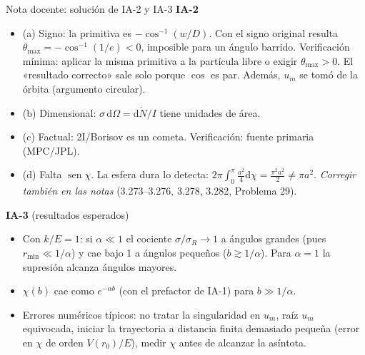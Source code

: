 \documentclass[aspectratio=169]{beamer}
\providecommand{\sen}{}
\renewcommand{\sen}{\operatorname{sen}}
\newcommand{\tmax}{\theta_{\max}}
\newcommand{\rmin}{r_{\min}}
\newcommand{\um}{u_{m}}
\newcommand{\dd}{\mathrm{d}}
\begin{document}
\begin{frame}{Nota docente: solución de IA-2 y IA-3}
\footnotesize
\textbf{IA-2}
\begin{itemize}
  \item (a) Signo: la primitiva es $-\cos^{-1}(w/D)$. Con el signo original resulta
        $\tmax=-\cos^{-1}(1/e)<0$, imposible para un ángulo barrido. Verificación mínima:
        aplicar la misma primitiva a la partícula libre o exigir $\tmax>0$. El «resultado
        correcto» sale solo porque $\cos$ es par. Además, $\um$ se tomó de la órbita
        (argumento circular).
  \item (b) Dimensional: $\sigma\,\dd\Omega=\dd\dot N/I$ tiene unidades de área.
  \item (c) Factual: 2I/Borisov es un cometa. Verificación: fuente primaria (MPC/JPL).
  \item (d) Falta $\sen\chi$. La esfera dura lo detecta:
        $2\pi\int_0^\pi\frac{a^2}{4}\dd\chi=\frac{\pi^2a^2}{2}\neq\pi a^2$.
        \emph{Corregir también en las notas} (3.273–3.276, 3.278, 3.282, Problema 29).
\end{itemize}
\textbf{IA-3} (resultados esperados)
\begin{itemize}
  \item Con $k/E=1$: si $\alpha\ll1$ el cociente $\sigma/\sigma_R\to1$ a ángulos grandes
        (pues $\rmin\ll1/\alpha$) y cae bajo 1 a ángulos pequeños ($b\gtrsim1/\alpha$).
        Para $\alpha=1$ la supresión alcanza ángulos mayores.
  \item $\chi(b)$ cae como $e^{-\alpha b}$ (con el prefactor de IA-1) para $b\gg1/\alpha$.
  \item Errores numéricos típicos: no tratar la singularidad en $\um$, raíz $\um$ equivocada,
        iniciar la trayectoria a distancia finita demasiado pequeña (error en $\chi$ de orden
        $V(r_0)/E$), medir $\chi$ antes de alcanzar la asíntota.
\end{itemize}
\end{frame}
\end{document}
